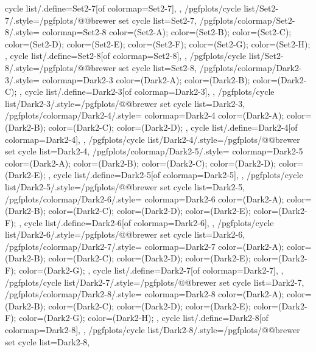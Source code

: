 {{    cycle list/.define={Set2-7}{[of colormap=Set2-7]},
  },
  /pgfplots/cycle list/Set2-7/.style={/pgfplots/@@brewer set cycle list={Set2-7}},
  /pgfplots/colormap/Set2-8/.style={
    colormap={Set2-8}{
      color=(Set2-A);
      color=(Set2-B);
      color=(Set2-C);
      color=(Set2-D);
      color=(Set2-E);
      color=(Set2-F);
      color=(Set2-G);
      color=(Set2-H);
    },
    cycle list/.define={Set2-8}{[of colormap=Set2-8]},
  },
  /pgfplots/cycle list/Set2-8/.style={/pgfplots/@@brewer set cycle list={Set2-8}},
  /pgfplots/colormap/Dark2-3/.style={
    colormap={Dark2-3}{
      color=(Dark2-A);
      color=(Dark2-B);
      color=(Dark2-C);
    },
    cycle list/.define={Dark2-3}{[of colormap=Dark2-3]},
  },
  /pgfplots/cycle list/Dark2-3/.style={/pgfplots/@@brewer set cycle list={Dark2-3}},
  /pgfplots/colormap/Dark2-4/.style={
    colormap={Dark2-4}{
      color=(Dark2-A);
      color=(Dark2-B);
      color=(Dark2-C);
      color=(Dark2-D);
    },
    cycle list/.define={Dark2-4}{[of colormap=Dark2-4]},
  },
  /pgfplots/cycle list/Dark2-4/.style={/pgfplots/@@brewer set cycle list={Dark2-4}},
  /pgfplots/colormap/Dark2-5/.style={
    colormap={Dark2-5}{
      color=(Dark2-A);
      color=(Dark2-B);
      color=(Dark2-C);
      color=(Dark2-D);
      color=(Dark2-E);
    },
    cycle list/.define={Dark2-5}{[of colormap=Dark2-5]},
  },
  /pgfplots/cycle list/Dark2-5/.style={/pgfplots/@@brewer set cycle list={Dark2-5}},
  /pgfplots/colormap/Dark2-6/.style={
    colormap={Dark2-6}{
      color=(Dark2-A);
      color=(Dark2-B);
      color=(Dark2-C);
      color=(Dark2-D);
      color=(Dark2-E);
      color=(Dark2-F);
    },
    cycle list/.define={Dark2-6}{[of colormap=Dark2-6]},
  },
  /pgfplots/cycle list/Dark2-6/.style={/pgfplots/@@brewer set cycle list={Dark2-6}},
  /pgfplots/colormap/Dark2-7/.style={
    colormap={Dark2-7}{
      color=(Dark2-A);
      color=(Dark2-B);
      color=(Dark2-C);
      color=(Dark2-D);
      color=(Dark2-E);
      color=(Dark2-F);
      color=(Dark2-G);
    },
    cycle list/.define={Dark2-7}{[of colormap=Dark2-7]},
  },
  /pgfplots/cycle list/Dark2-7/.style={/pgfplots/@@brewer set cycle list={Dark2-7}},
  /pgfplots/colormap/Dark2-8/.style={
    colormap={Dark2-8}{
      color=(Dark2-A);
      color=(Dark2-B);
      color=(Dark2-C);
      color=(Dark2-D);
      color=(Dark2-E);
      color=(Dark2-F);
      color=(Dark2-G);
      color=(Dark2-H);
    },
    cycle list/.define={Dark2-8}{[of colormap=Dark2-8]},
  },
  /pgfplots/cycle list/Dark2-8/.style={/pgfplots/@@brewer set cycle list={Dark2-8}},
}
